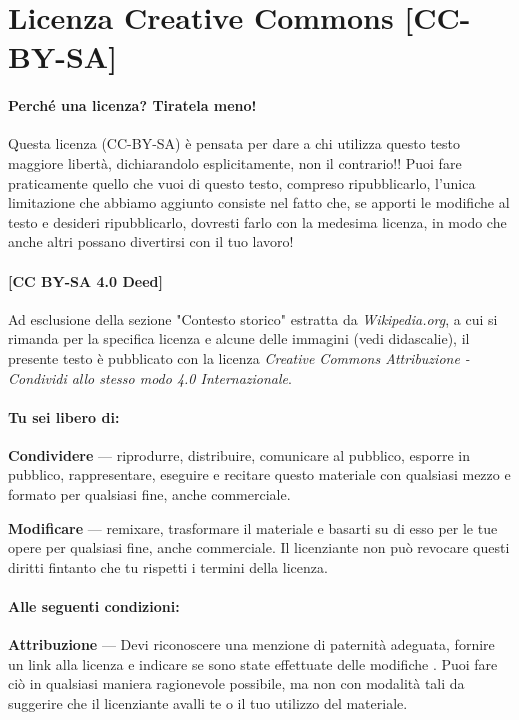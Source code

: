 \documentclass[letterpaper,twocolumn,openany,nodeprecatedcode]{dndbook}
\begin{document}
\chapter{Licenza Creative Commons [CC-BY-SA]}
\subsubsection{Perché una licenza? Tiratela meno!}

Questa licenza (CC-BY-SA) è pensata per dare a chi utilizza questo testo maggiore libertà, dichiarandolo esplicitamente, non il contrario!! Puoi fare praticamente quello che vuoi di questo testo, compreso ripubblicarlo, l'unica limitazione che abbiamo aggiunto consiste nel fatto che, se apporti le modifiche al testo e desideri ripubblicarlo, dovresti farlo con la medesima licenza, in modo che anche altri possano divertirsi con il tuo lavoro!

\subsubsection{[CC BY-SA 4.0 Deed]}
Ad esclusione della sezione "Contesto storico" estratta da \textit{Wikipedia.org}, a cui si rimanda per la specifica licenza e alcune delle immagini (vedi didascalie), il presente testo è pubblicato con la licenza \textit{Creative Commons Attribuzione - Condividi allo stesso modo 4.0 Internazionale}.

\subsubsection{Tu sei libero di:}

    \textbf{Condividere} — riprodurre, distribuire, comunicare al pubblico, esporre in pubblico, rappresentare, eseguire e recitare questo materiale con qualsiasi mezzo e formato per qualsiasi fine, anche commerciale.
    
    \textbf{Modificare} — remixare, trasformare il materiale e basarti su di esso per le tue opere per qualsiasi fine, anche commerciale.
    Il licenziante non può revocare questi diritti fintanto che tu rispetti i termini della licenza.

\subsubsection{Alle seguenti condizioni:}

    \textbf{Attribuzione} — Devi riconoscere una menzione di paternità adeguata, fornire un link alla licenza e indicare se sono state effettuate delle modifiche . Puoi fare ciò in qualsiasi maniera ragionevole possibile, ma non con modalità tali da suggerire che il licenziante avalli te o il tuo utilizzo del materiale.
    
\end{document}
